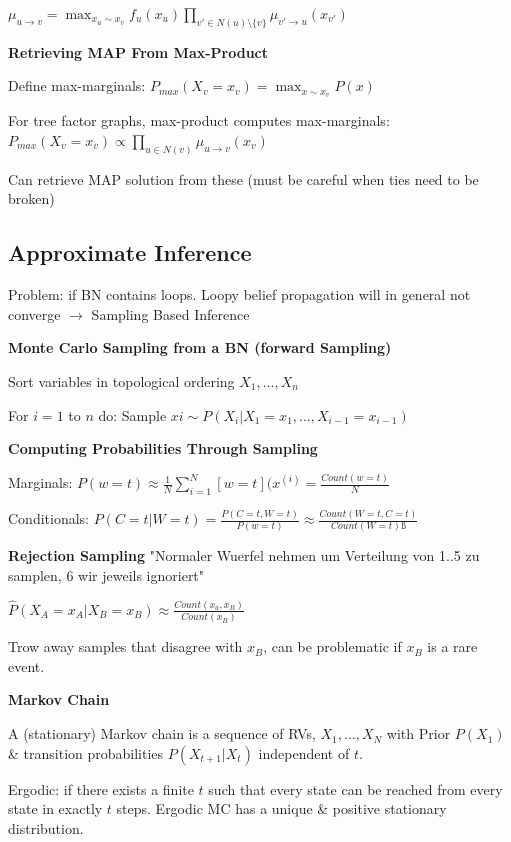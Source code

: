 \documentclass[a4paper, 11pt, landscape]{article}
\begin{document}
\begin{multicols*}{3}
$\mu_{u \rightarrow v} = \max_{x_u \sim x_v} f_u(x_u) \prod_{v' \in N(u) \setminus \{v\}} \mu_{v' \rightarrow u}(x_{v'})$ 
 
 \textbf{Retrieving MAP From Max-Product}
 \begin{compactitem}
 \item Define max-marginals: $P_{max}(X_v =x_v) = \max_{x \sim x_v} P(x)$
 \item For tree factor graphs, max-product computes max-marginals: 
 $P_{max}(X_v = x_v) \propto \prod_{u \in N(v)} \mu_{u \rightarrow v} (x_v)$ 
\item Can retrieve MAP solution from these (must be careful when ties need to be broken)
\end{compactitem}
\subsection{Approximate Inference}
Problem: if BN contains loops.
Loopy belief propagation will in general not converge	$\rightarrow$ Sampling Based Inference

\textbf{Monte Carlo Sampling from a BN (forward Sampling)}
\begin{compactitem}
	\item Sort variables in topological ordering $X_1,...,X_n$
	\item For $i=1$ to 	$n$ do: Sample $xi \sim P(X_i | X_1=x_1, ..., X_{i-1}=x_{i-1})$
\end{compactitem}

\textbf{Computing Probabilities Through Sampling}

Marginals: $P(w=t) \approx \frac{1}{N} \sum_{i=1}^{N}[w=t](x^{(i)} =\frac{ Count(w=t)}{N}$

Conditionals: $P(C=t | W=t) = \frac{P(C=t, W=t)}{P(w=t)} \approx \frac{Count(W=t, C=t)}{Count(W=t)ß}$

\textbf{Rejection Sampling}
"Normaler Wuerfel nehmen um Verteilung von 1..5 zu samplen, 6 wir jeweils ignoriert"

$\hat{P}(X_A = x_A | X_B = x_B) \approx \frac{Count(x_a, x_B)}{Count(x_B)}$

Trow away samples that disagree with $x_B$, can be problematic if $x_B$ is a rare event. 

\textbf{Markov Chain}

A (stationary) Markov chain is a sequence of RVs, $X_1,...,X_N$ with Prior $P(X_1)$ \& transition probabilities $P(X_{t+1} | X_t)$ independent of $t$.


Ergodic: if there exists a finite $t$ such that every state can be reached from every state in exactly $t$ steps. Ergodic MC has a unique \& positive stationary distribution.


\end{multicols*}
\end{document}
